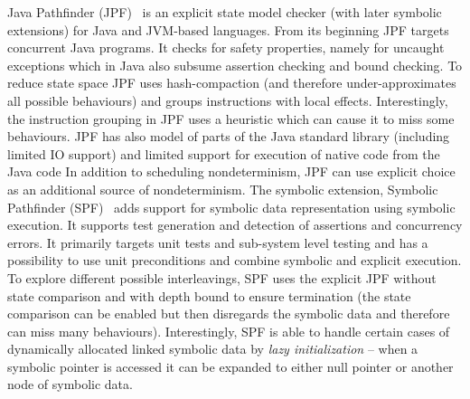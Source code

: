Java Pathfinder (JPF)~\cite{Artho2019,Visser2003} is an explicit state model
checker (with later symbolic extensions) for Java and JVM-based
languages.
From its beginning JPF targets concurrent Java programs.
It checks for safety properties, namely for uncaught exceptions which in Java also subsume assertion checking and bound checking.
To reduce state space JPF uses hash-compaction (and therefore under-approximates all possible behaviours) and groups instructions with local effects.
Interestingly, the instruction grouping in JPF uses a heuristic which can cause it to miss some behaviours.
JPF has also model of parts of the Java standard library (including limited IO
support) and limited support for execution of native code from the Java
code
In addition to scheduling nondeterminism, JPF can use explicit choice as an
additional source of nondeterminism.
The symbolic extension, Symbolic Pathfinder (SPF)~\cite{Pasareanu2013} adds
support for symbolic data representation using symbolic execution.
It supports test generation and detection of assertions and concurrency errors.
It primarily targets unit tests and sub-system level testing and has a
possibility to use unit preconditions and combine symbolic and explicit
execution.
To explore different possible interleavings, SPF uses the explicit JPF without
state comparison and with depth bound to ensure termination (the state
comparison can be enabled but then disregards the symbolic data and therefore
can miss many behaviours).
Interestingly, SPF is able to handle certain cases of dynamically allocated
linked symbolic data by \emph{lazy initialization} -- when a symbolic pointer
is accessed it can be expanded to either null pointer or another node of
symbolic data.

